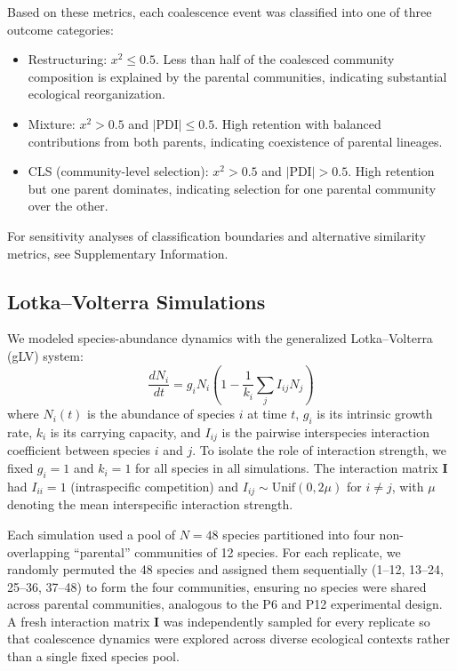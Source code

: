 Based on these metrics, each coalescence event was classified into one of three outcome categories:

\begin{itemize}
    \item Restructuring: $x^2 \leq 0.5$. Less than half of the coalesced community composition is explained by the parental communities, indicating substantial ecological reorganization.
    \item Mixture: $x^2 > 0.5$ and $|\text{PDI}| \leq 0.5$. High retention with balanced contributions from both parents, indicating coexistence of parental lineages.
    \item CLS (community-level selection): $x^2 > 0.5$ and $|\text{PDI}| > 0.5$. High retention but one parent dominates, indicating selection for one parental community over the other.
\end{itemize}

For sensitivity analyses of classification boundaries and alternative similarity metrics, see Supplementary Information.


\subsection*{Lotka--Volterra Simulations}
\label{sec:methods:simulations}

We modeled species-abundance dynamics with the generalized Lotka--Volterra (gLV) system:
\begin{equation}
\frac{dN_i}{dt} = g_i N_i \left(1 - \frac{1}{k_i} \sum_j I_{ij} N_j \right)
\label{eq:glv_methods}
\end{equation}
where $N_i(t)$ is the abundance of species $i$ at time $t$, $g_i$ is its intrinsic growth rate, $k_i$ is its carrying capacity, and $I_{ij}$ is the pairwise interspecies interaction coefficient between species $i$ and $j$. To isolate the role of interaction strength, we fixed $g_i = 1$ and $k_i = 1$ for all species in all simulations. The interaction matrix $\mathbf{I}$ had $I_{ii} = 1$ (intraspecific competition) and $I_{ij} \sim \text{Unif}(0, 2\mu)$ for $i \neq j$, with $\mu$ denoting the mean interspecific interaction strength.

Each simulation used a pool of $N = 48$ species partitioned into four non-overlapping ``parental'' communities of 12 species. For each replicate, we randomly permuted the 48 species and assigned them sequentially (1--12, 13--24, 25--36, 37--48) to form the four communities, ensuring no species were shared across parental communities, analogous to the P6 and P12 experimental design. A fresh interaction matrix $\mathbf{I}$ was independently sampled for every replicate so that coalescence dynamics were explored across diverse ecological contexts rather than a single fixed species pool.

